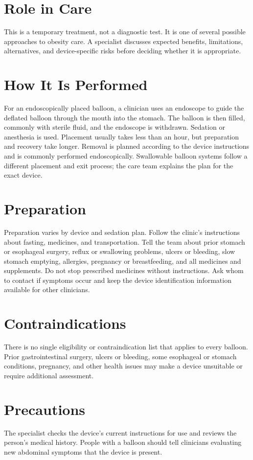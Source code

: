 \section*{Role in Care}
This is a temporary treatment, not a diagnostic test. It is one of several possible approaches to obesity care. A specialist discusses expected benefits, limitations, alternatives, and device-specific risks before deciding whether it is appropriate.

\section*{How It Is Performed}
For an endoscopically placed balloon, a clinician uses an endoscope to guide the deflated balloon through the mouth into the stomach. The balloon is then filled, commonly with sterile fluid, and the endoscope is withdrawn. Sedation or anesthesia is used. Placement usually takes less than an hour, but preparation and recovery take longer. Removal is planned according to the device instructions and is commonly performed endoscopically. Swallowable balloon systems follow a different placement and exit process; the care team explains the plan for the exact device.

\section*{Preparation}
Preparation varies by device and sedation plan. Follow the clinic's instructions about fasting, medicines, and transportation. Tell the team about prior stomach or esophageal surgery, reflux or swallowing problems, ulcers or bleeding, slow stomach emptying, allergies, pregnancy or breastfeeding, and all medicines and supplements. Do not stop prescribed medicines without instructions. Ask whom to contact if symptoms occur and keep the device identification information available for other clinicians.

\section*{Contraindications}
There is no single eligibility or contraindication list that applies to every balloon. Prior gastrointestinal surgery, ulcers or bleeding, some esophageal or stomach conditions, pregnancy, and other health issues may make a device unsuitable or require additional assessment.

\section*{Precautions}
The specialist checks the device's current instructions for use and reviews the person's medical history. People with a balloon should tell clinicians evaluating new abdominal symptoms that the device is present.

